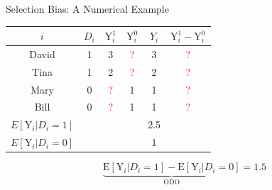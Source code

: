 \documentclass[hyperref={pdfpagelabels=false}]{beamer}
\begin{document}
	\begin{frame}{Selection Bias: A Numerical Example}
		\begin{center}
			\begin{threeparttable}
				\centering\footnotesize
				\begin{tabular}{cccccc}
					\toprule
					$i$ & $D_i$ & $\mathrm{Y}^{1}_{i}$ & $\mathrm{Y}^{0}_{i}$ & $Y_i$ & $\mathrm{Y}^{1}_{i}-\mathrm{Y}^{0}_{i}$ \\
					\midrule
					David & 1 & 3 & \textcolor{red}{?} & 3 & \textcolor{red}{?} \\
					Tina  & 1 & 2 & \textcolor{red}{?} & 2 & \textcolor{red}{?} \\
					Mary  & 0 & \textcolor{red}{?} & 1 & 1 & \textcolor{red}{?} \\
					Bill  & 0 & \textcolor{red}{?} & 1 & 1 & \textcolor{red}{?} \\
					\midrule
					$E[\mathrm{Y}_{i} | D_i=1]$ & & & & 2.5 & \\
					$E[\mathrm{Y}_{i} | D_i=0]$ & & & & 1   & \\
					\bottomrule
				\end{tabular}
			\end{threeparttable}
		\end{center}
		\vspace{0.2cm}
		\begin{equation*}
			\underbrace{\mathrm{E}[\mathrm{Y}_{i}|D_i=1] - \mathrm{E}[\mathrm{Y}_{i}|D_i=0]}_{\text{ODO}} = 1.5
		\end{equation*}
	\end{frame}
	
\end{document}

